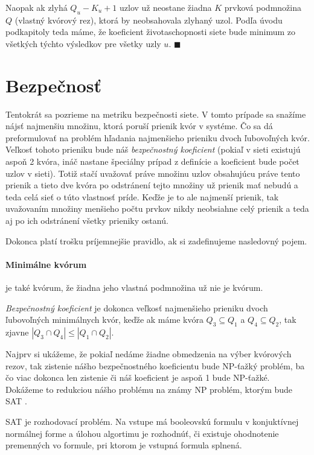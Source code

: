 Naopak ak zlyhá $Q_u-K_u+1$ uzlov už neostane žiadna $K$ prvková podmnožina $Q$
(vlastný kvórový rez), ktorá by neobsahovala zlyhaný uzol.
Podľa úvodu podkapitoly teda máme, že koeficient životaschopnosti siete bude
minimum zo všetkých týchto výsledkov pre všetky uzly $u$. $\blacksquare$

\section {Bezpečnosť}

\label{kap:security}

Tentokrát sa pozrieme na metriku bezpečnosti siete. V tomto prípade sa snažíme
nájsť najmenšiu množinu, ktorá poruší prienik kvór v systéme. Čo sa dá preformulovať
na problém hľadania najmenšieho prieniku dvoch ľubovoľných kvór. Veľkosť tohoto
prieniku bude náš \textit{bezpečnostný koeficient} (pokiaľ v sieti existujú aspoň 2 kvóra,
ináč nastane špeciálny prípad z definície a koeficient bude počet uzlov v sieti).
Totiž stačí uvažovať práve množinu uzlov obsahujúcu práve tento prienik a tieto
dve kvóra po odstránení tejto množiny už prienik mať nebudú a teda celá sieť o túto
vlastnosť príde.
Keďže je to ale najmenší prienik, tak uvažovaním množiny menšieho počtu prvkov
nikdy neobsiahne celý prienik a teda aj po ich odstránení všetky prieniky ostanú.

Dokonca platí trošku príjemnejšie pravidlo, ak si zadefinujeme nasledovný pojem.

\paragraph {Minimálne kvórum} je také kvórum, že žiadna jeho vlastná podmnožina
už nie je kvórum.

\vspace{3mm}
\textit{Bezpečnostný koeficient} je dokonca veľkosť najmenšieho prieniku dvoch
ľubovoľných minimálnych kvór, keďže ak máme kvóra $Q_3\subseteq Q_1$ a $Q_4\subseteq Q_2$,
tak zjavne $|Q_3\cap Q_4|\leq |Q_1\cap Q_2|$.

\vspace{4mm}
Najprv si ukážeme, že pokiaľ nedáme žiadne obmedzenia na výber kvórových rezov,
tak zistenie nášho bezpečnostného koeficientu bude NP-ťažký problém, ba čo viac
dokonca len zistenie či náš koeficient je aspoň 1 bude NP-ťažké.
Dokážeme to redukciou nášho problému na známy NP problém, ktorým bude SAT
\cite{cook1971complexity}.

SAT je rozhodovací problém. Na vstupe má booleovskú formulu v konjuktívnej normálnej
forme a úlohou algortimu je rozhodnúť, či existuje ohodnotenie premenných vo formule,
pri ktorom je vstupná formula splnená.

